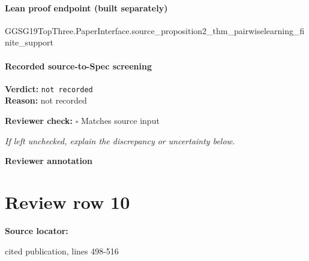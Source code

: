 \documentclass[10pt]{article}
\newcommand{\reviewerbox}{%
  \par\noindent\fbox{\parbox{0.96\linewidth}{\rule{0pt}{0.38in}}}\par
}
\newcommand{\reviewmatch}[1]{%
  \par\noindent\textbf{Reviewer check:} $\square$\; #1\par
  \noindent\emph{If left unchecked, explain the discrepancy or uncertainty below.}\par
}
\begin{document}
\paragraph{Lean proof endpoint (built separately)}\begin{ReviewVerbatim}
GGSG19TopThree.PaperInterface.source_proposition2_thm_pairwiselearning_finite_support
\end{ReviewVerbatim}

\paragraph{Recorded source-to-Spec screening}
\textbf{Verdict:} \texttt{not recorded}
\\
\textbf{Reason:} not recorded
\reviewmatch{Matches source input}
\noindent\textbf{Reviewer annotation}\par
\reviewerbox
\clearpage
\hypertarget{source-claim-baeee6d035a90ee1}{}
\section*{Review row 10}
\textbf{Source locator:} {\footnotesize\raggedright cited publication, lines 498-\allowbreak{}516\par}
\end{document}
